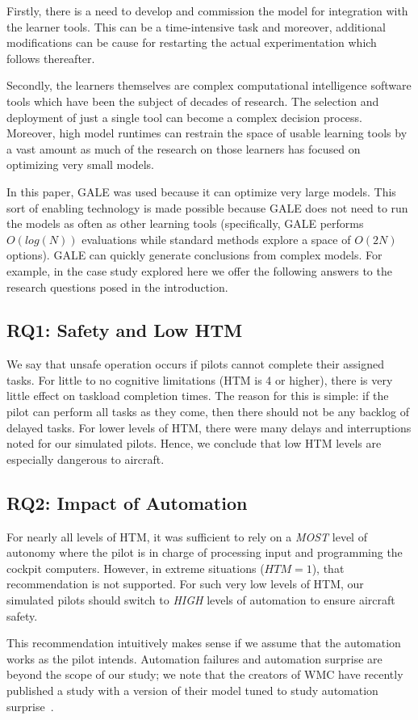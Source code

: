 \documentclass[journal]{IEEEtran}
\newenvironment{changed}{\par}{\par}
\begin{document}
Firstly, there is a need to develop and commission the model for integration
with the learner tools.  
This can be a time-intensive task and moreover, additional modifications can be cause for restarting the actual experimentation which follows thereafter.  

Secondly, the learners themselves are complex computational intelligence software tools which have been the subject of decades of research.  
The selection and deployment of just a single tool can become a complex decision
process.  
Moreover, high model runtimes can restrain the space of usable learning tools by a vast amount as much of the research on those learners has focused on optimizing very small models.  

In this paper, GALE was used because it can optimize very large models.  
This sort of enabling technology is made possible because GALE does not need to run the models as often as other learning tools (specifically, GALE performs $O(log(N))$ evaluations while standard methods explore a space of $O(2N)$ options).
GALE can quickly generate conclusions from complex models. 
For example, in the case study explored here we offer the following answers to the research questions posed in the introduction.




\subsection{RQ1: Safety and Low HTM}
We say that unsafe operation occurs if pilots cannot complete their assigned tasks.
For little to no cognitive limitations (HTM is 4 or higher), there is very little effect on taskload completion times.  
The reason for this is simple: if the pilot can perform all tasks as they come, then there should not be any backlog of delayed tasks.  
For lower levels of HTM, there were many delays and interruptions noted for our simulated pilots. 
Hence, we conclude that low HTM levels are especially dangerous to aircraft.

\subsection{RQ2: Impact of Automation}

For nearly all levels of HTM, it was sufficient to rely on a {\em MOST} level of autonomy where the pilot is in charge of processing input and programming the cockpit computers.
However, in extreme situations ($\mathit{HTM}=1$), that recommendation is not supported.  
For such very low levels of HTM, our simulated pilots should switch to {\em HIGH} levels of automation to ensure aircraft safety.
\begin{changed}
This recommendation intuitively makes sense if we assume that the automation works as the pilot intends.
Automation failures and automation surprise are beyond the scope of our study; we note that the creators of WMC have recently published a study with a version of their model tuned to study automation surprise~\cite{Gelman2014}.
\end{changed}
\end{document}
